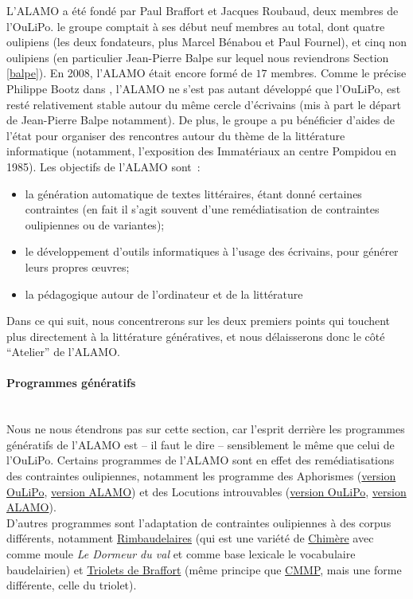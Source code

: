 \documentclass{article}
\newcommand{\subsubsubsection}[1]{\paragraph{#1}\mbox{}\\}
\begin{document}
				L'ALAMO a été fondé par Paul Braffort et Jacques Roubaud, deux membres de l'OuLiPo. le groupe comptait à ses début neuf membres au total, dont quatre oulipiens (les deux fondateurs, plus Marcel Bénabou et Paul Fournel), et cinq non oulipiens (en particulier Jean-Pierre Balpe sur lequel nous reviendrons Section \ref{balpe}). En 2008, l'ALAMO était encore formé de $17$ membres. Comme le précise Philippe Bootz dans \cite{bootz2012}, l'ALAMO ne s'est pas autant développé que l'OuLiPo, est resté relativement stable autour du même cercle d'écrivains (mis à part le départ de Jean-Pierre Balpe notamment). De plus, le groupe a pu bénéficier d'aides de l'état pour organiser des rencontres autour du thème de la littérature informatique (notamment, l'exposition des Immatériaux an centre Pompidou en 1985). Les objectifs de l'ALAMO \cite{alamo} sont~:
				\begin{itemize}
					\item la génération automatique de textes littéraires, étant donné certaines contraintes (en fait il s'agit souvent d'une remédiatisation de contraintes oulipiennes ou de variantes);
					\item le développement d'outils informatiques à l'usage des écrivains, pour générer leurs propres œuvres;
					\item la pédagogique autour de l'ordinateur et de la littérature
				\end{itemize}
				Dans ce qui suit, nous concentrerons sur les deux premiers points qui touchent plus directement à la littérature génératives, et nous délaisserons donc le côté ``Atelier'' de l'ALAMO.
				\subsubsubsection{Programmes génératifs}
					Nous ne nous étendrons pas sur cette section, car l'esprit derrière les programmes génératifs de l'ALAMO est -- il faut le dire -- sensiblement le même que celui de l'OuLiPo. Certains programmes de l'ALAMO sont en effet des remédiatisations des contraintes oulipiennes, notamment les programme des Aphorismes (\href{http://oulipo.net/fr/contraintes/aphorisme}{version OuLiPo}, \href{http://www.alamo.free.fr/pmwiki.php?n=Programmes.Aphorismes}{version ALAMO}) et des Locutions introuvables (\href{http://oulipo.net/fr/contraintes/locutions-introuvables}{version OuLiPo}, \href{http://www.alamo.free.fr/pmwiki.php?n=Programmes.LocutionsIntrouvables}{version ALAMO}).\\
					D'autres programmes sont l'adaptation de contraintes oulipiennes à des corpus différents, notamment \href{http://www.alamo.free.fr/pmwiki.php?n=Programmes.Rimbaudelaires}{Rimbaudelaires} (qui est une variété de \href{http://oulipo.net/fr/contraintes/chimere}{Chimère} avec comme moule \textit{Le Dormeur du val} et comme base lexicale le vocabulaire baudelairien) et \href{http://www.alamo.free.fr/pmwiki.php?n=Programmes.Triolets}{Triolets de Braffort} (même principe que \href{http://oulipo.net/fr/contraintes/cmmp}{CMMP}, mais une forme différente, celle du triolet).\\
\end{document}
